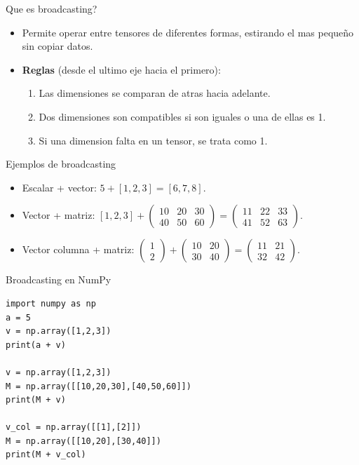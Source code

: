 \documentclass[aspectratio=169, 10pt, xcolor=table]{beamer}
\begin{document}
\begin{frame}{Que es broadcasting?}
    \begin{itemize}
        \item Permite operar entre tensores de diferentes formas, estirando el mas pequeño sin copiar datos.
        \item \textbf{Reglas} (desde el ultimo eje hacia el primero):
        \begin{enumerate}
            \item Las dimensiones se comparan de atras hacia adelante.
            \item Dos dimensiones son compatibles si son iguales o una de ellas es 1.
            \item Si una dimension falta en un tensor, se trata como 1.
        \end{enumerate}
    \end{itemize}
\end{frame}

\begin{frame}{Ejemplos de broadcasting}
    \begin{itemize}
        \item Escalar + vector: $5 + [1,2,3] = [6,7,8]$.
        \item Vector + matriz: $[1,2,3] + \begin{pmatrix}10&20&30\\40&50&60\end{pmatrix} = \begin{pmatrix}11&22&33\\41&52&63\end{pmatrix}$.
        \item Vector columna + matriz: $\begin{pmatrix}1\\2\end{pmatrix} + \begin{pmatrix}10&20\\30&40\end{pmatrix} = \begin{pmatrix}11&21\\32&42\end{pmatrix}$.
    \end{itemize}
\end{frame}

\begin{frame}[fragile]{Broadcasting en NumPy}
\begin{lstlisting}
import numpy as np
a = 5
v = np.array([1,2,3])
print(a + v)

v = np.array([1,2,3])
M = np.array([[10,20,30],[40,50,60]])
print(M + v)

v_col = np.array([[1],[2]])
M = np.array([[10,20],[30,40]])
print(M + v_col)
\end{lstlisting}
\end{frame}
\end{document}
